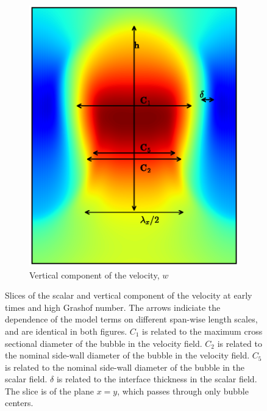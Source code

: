 \begin{figure}
\begin{subfigure}[b]{\columnwidth}
\includegraphics[width=\columnwidth]{figs/slice_w}
\caption{Vertical component of the velocity, $w$}
\end{subfigure}
\caption{ 
Slices of the scalar and vertical component of the velocity at early times and high Grashof number.
The arrows indiciate the dependence of the model terms on different span-wise length scales, and are identical in both figures.
$C_1$ is related to the maximum cross sectional diameter of the bubble in the velocity field.
$C_2$ is related to the nominal side-wall diameter of the bubble in the velocity field.
$C_5$ is related to the nominal side-wall diameter of the bubble in the scalar field.
$\delta$ is related to the interface thickness in the scalar field.
The slice is of the plane $x=y$, which passes through only bubble centers.
}
\end{figure}

